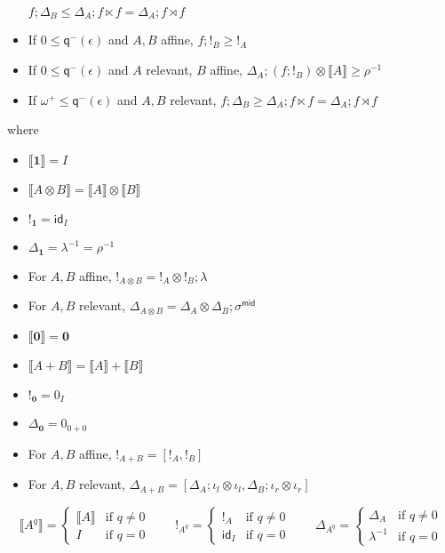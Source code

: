\documentclass[acmsmall,screen,review]{acmart}
\newcommand{\mb}[1]{\ensuremath{\mathbf{#1}}}
\newcommand{\ms}[1]{\ensuremath{\mathsf{#1}}}
\newcommand{\dnt}[1]{\llbracket{#1}\rrbracket}
\newcommand{\dmor}[1]{{\Delta}_{#1}}
\newcommand{\subiterssa}{\(\lambda_{\ms{iter}}\)}
\newcommand{\zeroq}{0}
\newcommand{\cpyq}{\omega^+}
\newcommand{\alquant}{\ms{q}}
\begin{document}
\begin{definition}[\subiterssa-model]
\begin{itemize}
    $f ; \dmor{B} \leq \dmor{A} ; f \ltimes f = \dmor{A} ; f \rtimes f$
    \item If $\zeroq \leq \alquant^-(\epsilon)$ and $A, B$ affine, $f ; !_B \geq !_A$
    \item If $\zeroq \leq \alquant^-(\epsilon)$ and $A$ relevant, $B$ affine, 
      $\dmor{A} ; (f ; !_B) \otimes \dnt{A} \geq \rho^{-1}$
    \item If $\cpyq \leq \alquant^-(\epsilon)$ and $A, B$ relevant, 
    $f ; \dmor{B} \geq \dmor{A} ; f \ltimes f = \dmor{A} ; f \rtimes f$
  \end{itemize}
  where
  \begin{itemize}
    \item $\dnt{\mb{1}} = I$
    \item $\dnt{A \otimes B} = \dnt{A} \otimes \dnt{B}$
    \item $!_{\mb{1}} = \ms{id}_I$
    \item $\Delta_{\mb{1}} = \lambda^{-1} = \rho^{-1}$
    \item For $A, B$ affine, $!_{A \otimes B} = !_A \otimes !_B ; \lambda$
    \item For $A, B$ relevant, 
    $\Delta_{A \otimes B} 
      = \dmor{A} \otimes \dmor{B}
      ; \sigma^{\ms{mid}}
    $
    \item $\dnt{\mb{0}} = \mb{0}$
    \item $\dnt{A + B} = \dnt{A} + \dnt{B}$
    \item $!_{\mb{0}} = 0_{I}$
    \item $\Delta_{\mb{0}} = 0_{0 + 0}$
    \item For $A, B$ affine, $!_{A + B} = [!_A, !_B]$
    \item For $A, B$ relevant, 
    $\Delta_{A + B} 
      = [\dmor{A} ; \iota_l \otimes \iota_l, \dmor{B} ; \iota_r \otimes \iota_r]
    $
  \end{itemize}
\end{definition}

\begin{equation*}
  \dnt{A^q} = \begin{cases}
    \dnt{A} & \text{if } q \neq 0 \\
    I       & \text{if } q = 0
  \end{cases} \qquad
  !_{A^q} = \begin{cases}
    !_A & \text{if } q \neq 0 \\
    \ms{id}_I & \text{if } q = 0
  \end{cases} \qquad
  \Delta_{A^q} = \begin{cases}
    \dmor{A} & \text{if } q \neq 0 \\
    \lambda^{-1} & \text{if } q = 0
  \end{cases}
\end{equation*}
\end{document}
